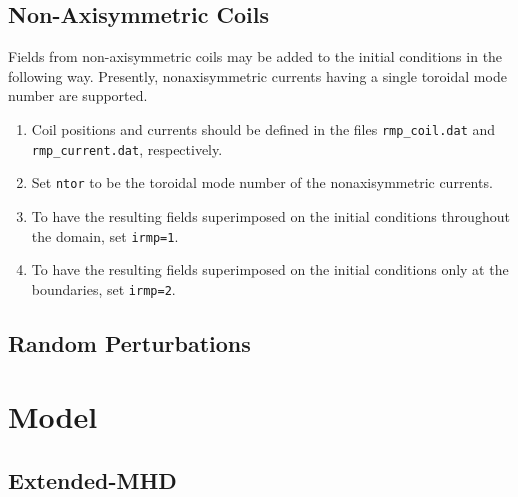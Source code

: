 \documentclass[letterpaper]{book}
\begin{document}
\section{Non-Axisymmetric Coils}

Fields from non-axisymmetric coils may be added to the initial
conditions in the following way.  Presently, nonaxisymmetric currents
having a single toroidal mode number are supported.

\begin{enumerate}
\item Coil positions and currents should be defined in the files
  \texttt{rmp\_coil.dat} and \texttt{rmp\_current.dat}, respectively.
\item Set \texttt{ntor} to be the toroidal mode number of the
  nonaxisymmetric currents.
\item To have the resulting fields superimposed on the initial
  conditions throughout the domain, set \texttt{irmp=1}.
\item To have the resulting fields superimposed on the initial
  conditions only at the boundaries, set \texttt{irmp=2}.
\end{enumerate}


\section{Random Perturbations}



\chapter{Model}

\section{Extended-MHD}
\end{document}
